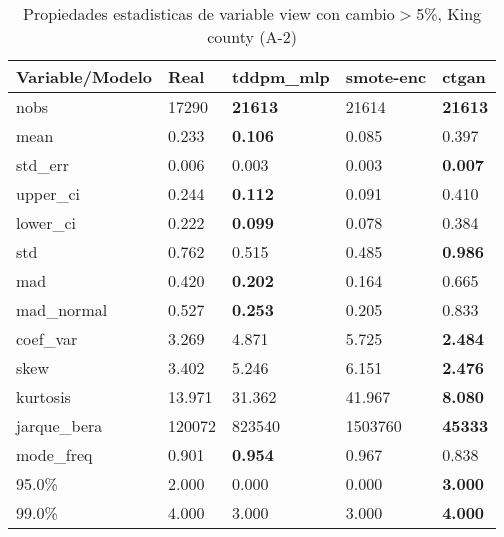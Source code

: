 \begin{table}[H]
\centering
\fontsize{8}{14}\selectfont
\caption{Propiedades estadisticas de variable view con cambio\ensuremath{>}5\%, King county (A-2)}
\label{table-stats-king county-a-2-view-short}
\begin{tabular}{|l|m{10em}|m{10em}|m{10em}|m{10em}|}
\hline
 \rowcolor[gray]{0.8}
Variable/Modelo & Real & tddpm\_mlp & smote-enc & ctgan \\
\hline nobs & 17290 & \bfseries 21613 & \cellcolor[rgb]{0.9, 0.54, 0.52} 21614 & \bfseries 21613 \\
\hline mean & 0.233 & \bfseries 0.106 & 0.085 & \cellcolor[rgb]{0.9, 0.54, 0.52} 0.397 \\
\hline std\_err & 0.006 & 0.003 & \cellcolor[rgb]{0.9, 0.54, 0.52} 0.003 & \bfseries 0.007 \\
\hline upper\_ci & 0.244 & \bfseries 0.112 & 0.091 & \cellcolor[rgb]{0.9, 0.54, 0.52} 0.410 \\
\hline lower\_ci & 0.222 & \bfseries 0.099 & 0.078 & \cellcolor[rgb]{0.9, 0.54, 0.52} 0.384 \\
\hline std & 0.762 & 0.515 & \cellcolor[rgb]{0.9, 0.54, 0.52} 0.485 & \bfseries 0.986 \\
\hline mad & 0.420 & \bfseries 0.202 & \cellcolor[rgb]{0.9, 0.54, 0.52} 0.164 & 0.665 \\
\hline mad\_normal & 0.527 & \bfseries 0.253 & \cellcolor[rgb]{0.9, 0.54, 0.52} 0.205 & 0.833 \\
\hline coef\_var & 3.269 & 4.871 & \cellcolor[rgb]{0.9, 0.54, 0.52} 5.725 & \bfseries 2.484 \\
\hline skew & 3.402 & 5.246 & \cellcolor[rgb]{0.9, 0.54, 0.52} 6.151 & \bfseries 2.476 \\
\hline kurtosis & 13.971 & 31.362 & \cellcolor[rgb]{0.9, 0.54, 0.52} 41.967 & \bfseries 8.080 \\
\hline jarque\_bera & 120072 & 823540 & \cellcolor[rgb]{0.9, 0.54, 0.52} 1503760 & \bfseries 45333 \\
\hline mode\_freq & 0.901 & \bfseries 0.954 & \cellcolor[rgb]{0.9, 0.54, 0.52} 0.967 & 0.838 \\
\hline 95.0\% & 2.000 & \cellcolor[rgb]{0.9, 0.54, 0.52} 0.000 & \cellcolor[rgb]{0.9, 0.54, 0.52} 0.000 & \bfseries 3.000 \\
\hline 99.0\% & 4.000 & \cellcolor[rgb]{0.9, 0.54, 0.52} 3.000 & \cellcolor[rgb]{0.9, 0.54, 0.52} 3.000 & \bfseries 4.000 \\
\hline
\end{tabular}
\end{table}
